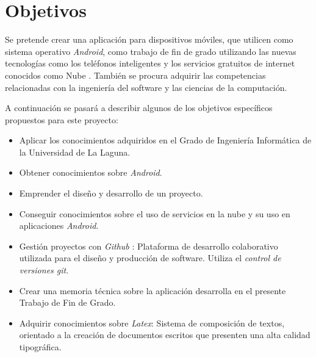 %
%
%
%

\cleardoublepage
\chapter{Objetivos}
\label{chap:objetives}

	Se pretende crear una aplicación para dispositivos móviles, que utilicen como sistema operativo {\it Android}, como trabajo de fin de grado utilizando las nuevas tecnologías como los teléfonos inteligentes y los servicios gratuitos de internet conocidos como Nube \cite{57:nube:online}. También se procura adquirir las competencias relacionadas con la ingeniería del software y las ciencias de la computación. 
	
	A continuación se pasará a describir algunos de los objetivos específicos propuestos para este proyecto:
	
	\begin{itemize}
		\item Aplicar los conocimientos adquiridos en el Grado de Ingeniería Informática de la Universidad de La Laguna.
		\item Obtener conocimientos sobre {\it Android}.
		\item Emprender el diseño y desarrollo de un proyecto.
		\item Conseguir conocimientos sobre el uso de servicios en la nube y su uso en aplicaciones {\it Android}.
		\item Gestión proyectos con {\it Github} \cite{9:github:online}: Plataforma de desarrollo colaborativo utilizada para el diseño y producción de software. Utiliza el {\it control de versiones git}.
		\item Crear una memoria técnica sobre la aplicación desarrolla en el presente Trabajo de Fin de Grado.
		\item Adquirir conocimientos sobre {\it Latex}\cite{8:latex:online}: Sistema de composición de textos, orientado a la creación de documentos escritos que presenten una alta calidad tipográfica.
	\end{itemize}